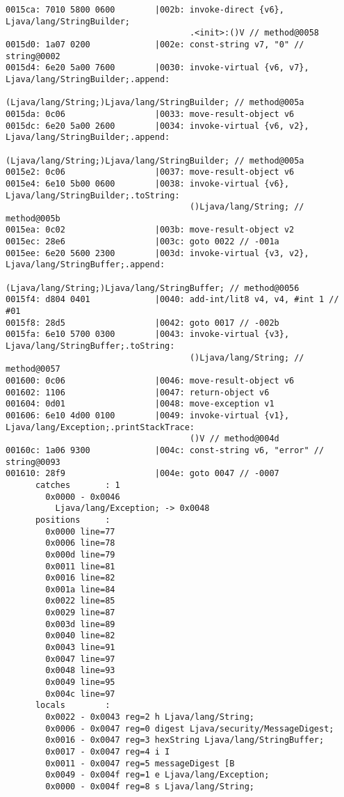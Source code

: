 \begin{lstlisting}
0015ca: 7010 5800 0600        |002b: invoke-direct {v6}, Ljava/lang/StringBuilder;
                                     .<init>:()V // method@0058
0015d0: 1a07 0200             |002e: const-string v7, "0" // string@0002
0015d4: 6e20 5a00 7600        |0030: invoke-virtual {v6, v7}, Ljava/lang/StringBuilder;.append:
                                     (Ljava/lang/String;)Ljava/lang/StringBuilder; // method@005a
0015da: 0c06                  |0033: move-result-object v6
0015dc: 6e20 5a00 2600        |0034: invoke-virtual {v6, v2}, Ljava/lang/StringBuilder;.append:
                                     (Ljava/lang/String;)Ljava/lang/StringBuilder; // method@005a
0015e2: 0c06                  |0037: move-result-object v6
0015e4: 6e10 5b00 0600        |0038: invoke-virtual {v6}, Ljava/lang/StringBuilder;.toString:
                                     ()Ljava/lang/String; // method@005b
0015ea: 0c02                  |003b: move-result-object v2
0015ec: 28e6                  |003c: goto 0022 // -001a
0015ee: 6e20 5600 2300        |003d: invoke-virtual {v3, v2}, Ljava/lang/StringBuffer;.append:
                                     (Ljava/lang/String;)Ljava/lang/StringBuffer; // method@0056
0015f4: d804 0401             |0040: add-int/lit8 v4, v4, #int 1 // #01
0015f8: 28d5                  |0042: goto 0017 // -002b
0015fa: 6e10 5700 0300        |0043: invoke-virtual {v3}, Ljava/lang/StringBuffer;.toString:
                                     ()Ljava/lang/String; // method@0057
001600: 0c06                  |0046: move-result-object v6
001602: 1106                  |0047: return-object v6
001604: 0d01                  |0048: move-exception v1
001606: 6e10 4d00 0100        |0049: invoke-virtual {v1}, Ljava/lang/Exception;.printStackTrace:
                                     ()V // method@004d
00160c: 1a06 9300             |004c: const-string v6, "error" // string@0093
001610: 28f9                  |004e: goto 0047 // -0007
      catches       : 1
        0x0000 - 0x0046
          Ljava/lang/Exception; -> 0x0048
      positions     :
        0x0000 line=77
        0x0006 line=78
        0x000d line=79
        0x0011 line=81
        0x0016 line=82
        0x001a line=84
        0x0022 line=85
        0x0029 line=87
        0x003d line=89
        0x0040 line=82
        0x0043 line=91
        0x0047 line=97
        0x0048 line=93
        0x0049 line=95
        0x004c line=97
      locals        :
        0x0022 - 0x0043 reg=2 h Ljava/lang/String;
        0x0006 - 0x0047 reg=0 digest Ljava/security/MessageDigest;
        0x0016 - 0x0047 reg=3 hexString Ljava/lang/StringBuffer;
        0x0017 - 0x0047 reg=4 i I
        0x0011 - 0x0047 reg=5 messageDigest [B
        0x0049 - 0x004f reg=1 e Ljava/lang/Exception;
        0x0000 - 0x004f reg=8 s Ljava/lang/String;


\end{lstlisting}
